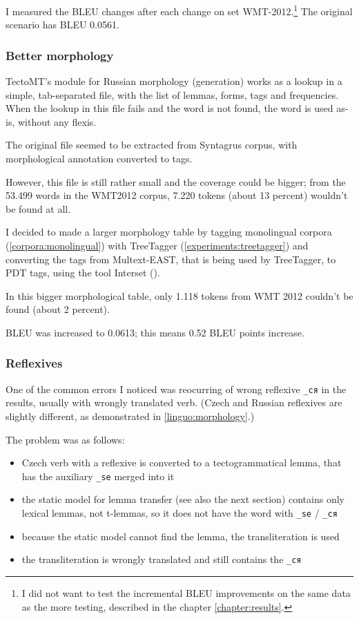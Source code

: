 I measured the BLEU changes after each change on  set WMT-2012.\footnote{I did not want to test the incremental BLEU improvements on the same data as the more  testing, described in the chapter \ref{chapter:results}.}
The original scenario has BLEU 0.0561.




\subsubsection{Better morphology}
TectoMT's module for Russian morphology (generation) works as a lookup in a simple, tab-separated file, with the list of lemmas, forms, tags and frequencies. When the lookup in this file fails and the word is not found, the word is used as-is, without any flexis.

The original file seemed to be extracted from Syntagrus corpus, with morphological annotation converted to  tags.

However, this file is still rather small and the coverage could be bigger; from the 53.499 words in the WMT2012 corpus, 7.220 tokens (about 13 percent) wouldn't be found at all.

I decided to made a larger morphology table by tagging monolingual corpora (\ref{corpora:monolingual}) with TreeTagger (\ref{experiments:treetagger}) and converting the tags from Multext-EAST, that is being used by TreeTagger, to PDT tags, using the tool Interset (\cite{interset}).

In this bigger morphological table, only 1.118 tokens from WMT 2012 couldn't be found (about 2 percent). 

BLEU was increased to 0.0613; this means 0.52 BLEU points increase.

\subsubsection{Reflexives}
One of the common errors I noticed was reocurring of wrong reflexive \texttt{\_ся} in the results, usually with wrongly translated verb. (Czech and Russian reflexives are slightly different, as demonstrated in \ref{linguo:morphology}.)

The problem was as follows:
\begin{itemize}
\item Czech verb with a reflexive is converted to a tectogrammatical lemma, that has the auxiliary \texttt{\_se} merged into it
\item the static model for lemma transfer (see also the next section) contains only lexical lemmas, not t-lemmas, so it does not have the word with \texttt{\_se} / \texttt{\_ся}
\item because the static model cannot find the lemma, the transliteration is used
\item the transliteration is wrongly translated and still contains the \texttt{\_ся}
\end{itemize}

